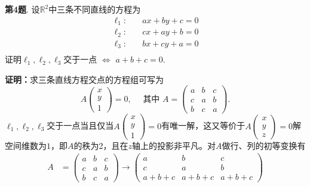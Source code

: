 \newpageorvspace

{\bf 第4题}. 设$\mathbb{R}^2$中三条不同直线的方程为
\begin{align*}
    \ell_1: & \quad ax+by+c=0 \\
    \ell_2: & \quad cx+ay+b=0 \\
    \ell_3: & \quad bx+cy+a=0 \\
\end{align*}
证明$\ell_1,\ell_2,\ell_3$交于一点 $\Longleftrightarrow$ $a+b+c=0$.

{\bf 证明：}求三条直线方程交点的方程组可写为
$$A\begin{pmatrix} x \\ y \\ 1 \end{pmatrix} = 0, \quad \text{ 其中 } A = \begin{pmatrix} a & b & c \\ c & a & b \\ b & c & a \end{pmatrix}.$$
$\ell_1,\ell_2,\ell_3$交于一点当且仅当$A\begin{pmatrix} x \\ y \\ 1 \end{pmatrix} = 0$有唯一解，这又等价于$A\begin{pmatrix} x \\ y \\ z \end{pmatrix} = 0$解空间维数为$1$，即$A$的秩为2，且在$z$轴上的投影非平凡。对$A$做行、列的初等变换有
\begin{align*}
A & = \begin{pmatrix} a & b & c \\ c & a & b \\ b & c & a \end{pmatrix} \to \begin{pmatrix} a & b & c \\ c & a & b \\ a+b+c & a+b+c & a+b+c \end{pmatrix}
\end{align*}

